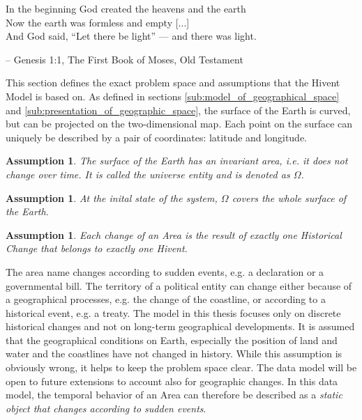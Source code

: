 \begin{quoteit}
In the beginning God created the heavens and the earth \\
Now the earth was formless and empty [...] \\
And God said, “Let there be light” --- and there was light.
\end{quoteit}
\hfill -- Genesis 1:1, The First Book of Moses, Old Testament

This section defines the exact problem space and assumptions that the Hivent Model is based on. As defined in sections \ref{sub:model_of_geographical_space} and \ref{sub:presentation_of_geographic_space}, the surface of the Earth is curved, but can be projected on the two-dimensional map. Each point on the surface can uniquely be described by a pair of coordinates: latitude and longitude.

\newtheorem{invariant_surface}[assumptioncounter]{Assumption}
\begin{invariant_surface}
\label{ass:invariant_surface}
The surface of the Earth has an invariant area, i.e. it does not change over time. It is called the \emph{universe} entity and is denoted as $\Omega$.
\end{invariant_surface}

\newtheorem{initial_configuration}[assumptioncounter]{Assumption}
\begin{initial_configuration}
\label{ass:initial_configuration}
At the inital state of the system, $\Omega$ covers the whole surface of the Earth.
\end{initial_configuration}

\newtheorem{change}[assumptioncounter]{Assumption}
\begin{change}
\label{ass:change}
Each change of an Area is the result of exactly one Historical Change that belongs to exactly one Hivent.
\end{change}

The area name changes according to sudden events, e.g. a declaration or a governmental bill. The territory of a political entity can change either because of a geographical processes, e.g. the change of the coastline, or according to a historical event, e.g. a treaty. The model in this thesis focuses only on discrete historical changes and not on long-term geographical developments. It is assumed that the geographical conditions on Earth, especially the position of land and water and the coastlines have not changed in history. While this assumption is obviously wrong, it helps to keep the problem space clear. The data model will be open to future extensions to account also for geographic changes. In this data model, the temporal behavior of an Area can therefore be described as a \emph{static object that changes according to sudden events}.



